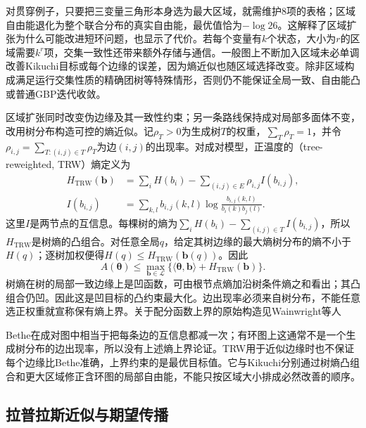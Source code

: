 对贯穿例子，只要把三变量三角形本身选为最大区域，就需维护$8$项的表格；区域自由能退化为整个联合分布的真实自由能，最优值恰为$-\log26$。这解释了区域扩张为什么可能改进短环问题，也显示了代价。若每个变量有$k$个状态，大小为$r$的区域需要$k^r$项，交集一致性还带来额外存储与通信。一般图上不断加入区域未必单调改善Kikuchi目标或每个边缘的误差，因为熵近似也随区域选择改变。除非区域构成满足运行交集性质的精确团树等特殊情形，否则仍不能保证全局一致、自由能凸或普通GBP迭代收敛。

区域扩张同时改变伪边缘及其一致性约束；另一条路线保持成对局部多面体不变，改用树分布构造可控的熵近似。记$\rho_T>0$为生成树$T$的权重，$\sum_T\rho_T=1$，并令$\rho_{i,j}=\sum_{T:(i,j)\in T}\rho_T$为边$(i,j)$的出现率。对成对模型，正温度的（tree-reweighted, TRW）熵定义为
\begin{equation}
  \begin{aligned}
    H_{\mathrm{TRW}}(\bm b)
      &=\sum_iH(b_i)-\sum_{(i,j)\in E}\rho_{i,j}I(b_{i,j}),\\
    I(b_{i,j})
      &=\sum_{k,l}b_{i,j}(k,l)
            \log\frac{b_{i,j}(k,l)}{b_i(k)b_j(l)}.
  \end{aligned}
  \label{eq:pgm-variational-trw-entropy}
\end{equation}
这里$I$是两节点的互信息。每棵树的熵为$\sum_iH(b_i)-\sum_{(i,j)\in T}I(b_{i,j})$，所以$H_{\mathrm{TRW}}$是树熵的凸组合。对任意全局$q$，给定其树边缘的最大熵树分布的熵不小于$H(q)$；逐树加权便得$H(q)\leq H_{\mathrm{TRW}}(\bm b(q))$。因此
\begin{equation}
  A(\bm{\theta})\leq
    \max_{\bm b\in\mathcal L}
       \{\langle\bm{\theta},\bm b\rangle+H_{\mathrm{TRW}}(\bm b)\}.
  \label{eq:pgm-variational-trw-partition}
\end{equation}
树熵在树的局部一致边缘上是凹函数，可由根节点熵加沿树条件熵之和看出；其凸组合仍凹。因此这是凹目标的凸约束最大化。边出现率必须来自树分布，不能任意选正权重就宣称保有熵上界。关于配分函数上界的原始构造见Wainwright等人

Bethe在成对图中相当于把每条边的互信息都减一次；有环图上这通常不是一个生成树分布的边出现率，所以没有上述熵上界论证。TRW用于近似边缘时也不保证每个边缘比Bethe准确，上界约束的是最优目标值。它与Kikuchi分别通过树熵凸组合和更大区域修正含环图的局部自由能，不能只按区域大小排成必然改善的顺序。

\subsection{拉普拉斯近似与期望传播}
\label{sec:pgm-variational-laplace-ep}
\label{sec:pgm-variational-ep}

